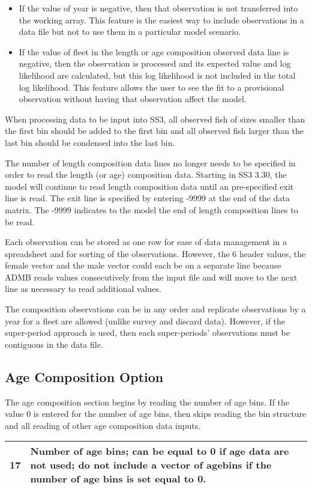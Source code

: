 	\begin{itemize}
		\item If the value of year is negative, then that observation is not transferred into the working array. This feature is the easiest way to include observations in a data file but not to use them in a particular model scenario.
		\item If the value of fleet in the length or age composition observed data line is negative, then the observation is processed and its expected value and log likelihood are calculated, but this log likelihood is not included in the total log likelihood. This feature allows the user to see the fit to a provisional observation without having that observation affect the model.
	\end{itemize}

When processing data to be input into SS3, all observed fish of sizes smaller than the first bin should be added to the first bin and all observed fish larger than the last bin should be condensed into the last bin.	

The number of length composition data lines no longer needs to be specified in order to read the length (or age) composition data. Starting in SS3 3.30, the model will continue to read length composition data until an pre-specified exit line is read.  The exit line is specified by entering -9999 at the end of the data matrix. The -9999 indicates to the model the end of length composition lines to be read.

Each observation can be stored as one row for ease of data management in a spreadsheet and for sorting of the observations.  However, the 6 header values, the female vector and the male vector could each be on a separate line because ADMB reads values consecutively from the input file and will move to the next line as necessary to read additional values.

The composition observations can be in any order and replicate observations by a year for a fleet are allowed (unlike survey and discard data).  However, if the super-period approach is used, then each super-periods' observations must be contiguous in the data file.

\subsection{Age Composition Option}
The age composition section begins by reading the number of age bins.  If the value 0 is entered for the number of age bins, then skips reading the bin structure and all reading of other age composition data inputs.
\begin{center}
	\begin{tabular}{p{2cm} p{13cm}  }
		\hline
		17 \Tstrut & Number of age bins; can be equal to 0 if age data are not used; do not include a vector of agebins if the number of age bins is set equal to 0.\Bstrut\\
		\hline
	\end{tabular}
\end{center}


